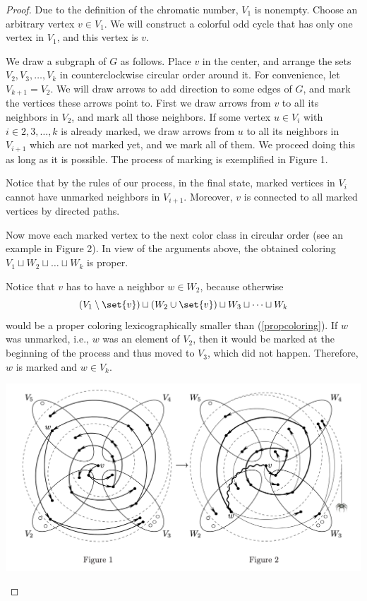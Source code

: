 \begin{problem}
\begin{proof}
Due to the definition of the chromatic number, $V_1$ is nonempty. Choose an arbitrary vertex $v \in V_1$. We will construct a colorful odd cycle that has only one vertex in $V_1$, and this vertex is $v$. 

We draw a subgraph of $G$ as follows. Place $v$ in the center, and arrange the sets $V_2, V_3, \dots , V_k$ in counterclockwise circular order around it. For convenience, let $V_{k+1} = V_2$. We will draw arrows to add direction to some edges of $G$, and mark the vertices these arrows point to. First we draw arrows from $v$ to all its neighbors in $V_2$, and mark all those neighbors. If some vertex $u \in V_i$ with $i \in {2, 3, \dots , k}$ is already marked, we draw arrows from $u$ to all its neighbors in $V_{i+1}$ which are not marked yet, and we mark all of them. We proceed doing this as long as it is possible. The process of marking is exemplified in Figure 1.

Notice that by the rules of our process, in the final state, marked vertices in $V_i$ cannot have unmarked neighbors in $V_{i+1}$. Moreover, $v$ is connected to all marked vertices by directed paths. 

Now move each marked vertex to the next color class in circular order (see an example in Figure 2). In view of the arguments above, the obtained coloring $V_1 \sqcup W_2 \sqcup \dots \sqcup W_k$ is proper. 

Notice that $v$ has to have a neighbor $w \in W_2$, because otherwise
\begin{equation}
(V_1  \setminus \set{v}) \sqcup (W_2 \cup \set{v}) \sqcup W_3 \sqcup \dots \sqcup W_k
\end{equation}
would be a proper coloring lexicographically smaller than (\ref{propcoloring}). If $w$ was unmarked, i.e., $w$ was an element of $V_2$, then it would be marked at the beginning of the process and thus moved to $V_3$, which did not happen. Therefore, $w$ is marked and $w \in V_k$.

\begin{center}
\includegraphics[width=18cm]{spider.png}
\label{fig:spider}
\end{center}


\end{proof}
\end{problem}
